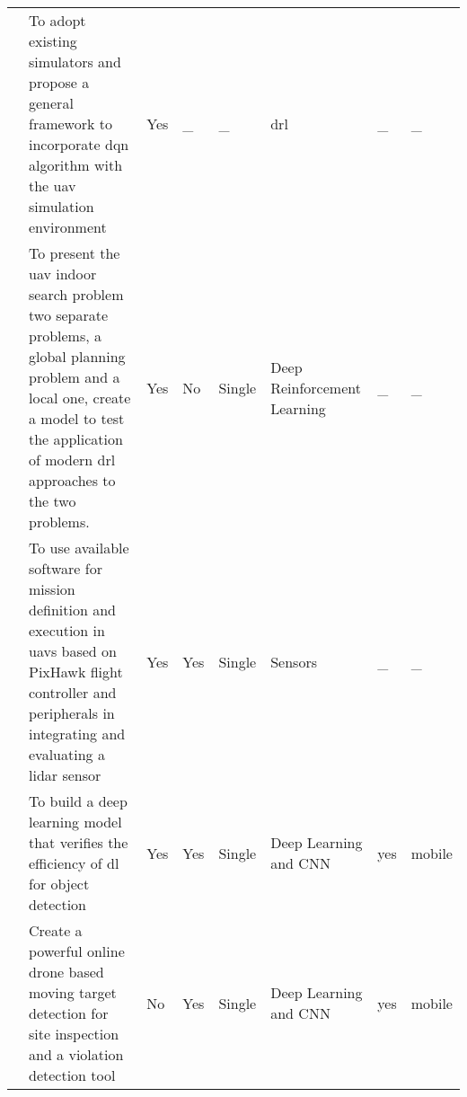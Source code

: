 {\begin{center}
\begin{small}
\begin{longtable}{ p{0.6cm} p{4cm} p{1.6cm} p{1.3cm} p{1.4cm} p{1.4cm} p{1.4cm} p{1.4cm} }
            \cite{Zho20}  
                & To adopt existing simulators and 
                propose a general framework to 
                incorporate \gls{dqn} algorithm with 
                the \gls{uav} simulation environment 
                    & Yes 
                        & \_ 
            &\_ 
                & \gls{drl} 
                     & \_ 
                         & \_ \\ \addlinespace

            \cite{Wal19}  
                 & To present the \gls{uav} indoor 
                 search problem two separate problems, 
                 a global planning problem and 
                 a local one, create a model to test 
                 the application of modern \gls{drl} 
                 approaches to the two problems. 
                    & Yes 
                        & No 
            & Single 
                & Deep Reinforcement Learning 
                    & \_ 
                        & \_ \\ \addlinespace

            \cite{Gar20} 
                & To use available software for 
                mission definition and execution in 
                \glspl{uav} based on PixHawk flight 
                controller and peripherals in 
                integrating and evaluating 
                a \gls{lidar} sensor 
                    & Yes 
                        & Yes 
            & Single 
                & Sensors 
                    & \_ 
                        & \_ \\ \addlinespace

            \cite{Zhao18} 
                & To build a deep learning model 
                that verifies the efficiency of 
                \gls{dl} for object detection 
                    & Yes 
                        & Yes 
            & Single 
                & Deep Learning and CNN 
                    & yes 
                        & mobile \\ \addlinespace

            \cite{Wang18} 
                & Create a powerful online drone 
                based moving target detection 
                for site inspection and 
                a violation detection tool 
                    & No 
                        & Yes 
            & Single 
                & Deep Learning and CNN 
                    & yes 
                        & mobile  \\


\end{longtable}
\end{small}
\end{center}}
